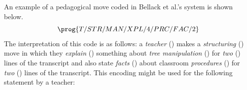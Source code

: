 \documentclass[conference]{IEEEtran}
\begin{document}


An example of a pedagogical move coded in Bellack et al.'s system is shown
below.
%
\[ \prog{T/STR/MAN/XPL/4/PRC/FAC/2} \]
%
The interpretation of this code is as follows: a \emph{teacher} ()
makes a \emph{structuring} () move in which they \emph{explain}
() something about \emph{tree manipulation} () for
\emph{two} () lines of the transcript and also state \emph{facts}
() about classroom \emph{procedures} () for \emph{two}
() lines of the transcript.
%
This encoding might be used for the following statement by a teacher:
%
\end{document}
